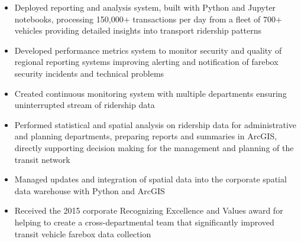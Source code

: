 \documentclass[letterpaper]{article}
\newcommand{\employer}[4]{
        \vspace{3pt}
        \textbf{#1}  %
        \hfill #2\\  %
        \textit{#3}  %
        \hfill #4\\  %
        \vspace{3mm}
    }
\newenvironment{jobtasklist}
        {
            \vspace{-12pt}
            \begin{itemize} \itemsep 0pt
        }{
            \end{itemize}
            \vspace{-3pt}
        }
\begin{document}
\begin{jobtasklist}
    \item Deployed reporting and analysis system, built with Python and Jupyter notebooks,
        processing 150,000+ transactions per day from a fleet of 700+ vehicles
        providing detailed insights into transport ridership patterns

    \item Developed performance metrics system to monitor security and quality
        of regional reporting systems improving alerting and notification of
        farebox security incidents and technical problems

    \item Created continuous monitoring system with multiple departments
            ensuring uninterrupted stream of ridership data

    \item Performed statistical and spatial analysis on ridership data for administrative
            and planning departments, preparing reports and summaries in ArcGIS, directly supporting
            decision making for the management and planning of the transit network

    \item Managed updates and integration of spatial data into the corporate spatial data warehouse
            with Python and ArcGIS

    \item Received the 2015 corporate Recognizing Excellence and Values award
        for helping to create a cross-departmental team that significantly
        improved transit vehicle farebox data collection


\end{jobtasklist}



%
%
%
\end{document}
